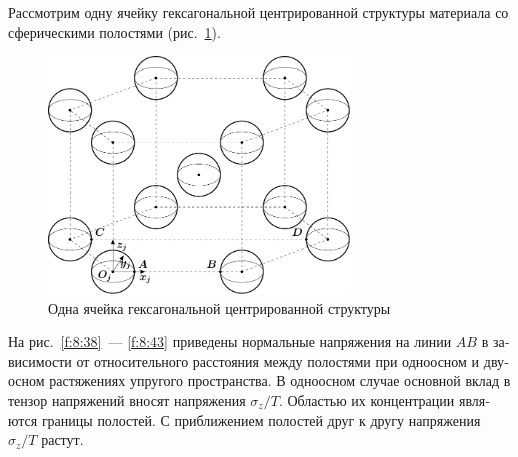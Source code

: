 \begin{russian}
Рассмотрим одну ячейку гексагональной центрированной структуры материала со сферическими полостями (рис.~\ref{f:8:37}).

\begin{figure}[h!]
\centering
\includegraphics[width=8cm]{spheres-cav-13.pdf}
\caption{Одна ячейка гексагональной центрированной структуры}
\label{f:8:37}
\end{figure}

На рис.~\ref{f:8:38}~--- \ref{f:8:43} приведены нормальные напряжения на линии $AB$ в зависимости от относительного расстояния между полостями при одноосном и двуосном растяжениях упругого пространства. В одноосном случае основной вклад в тензор напряжений вносят напряжения $\sigma_z/T$. Областью их концентрации являются границы полостей. С приближением полостей друг к другу напряжения $\sigma_z/T$ растут.


\end{russian}
